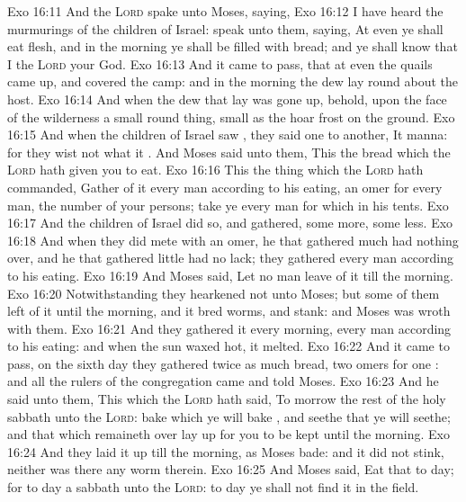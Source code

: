 \vs Exo 16:11 And the \textsc{Lord} spake unto Moses, saying,
\vs Exo 16:12 I have heard the murmurings of the children of Israel: speak unto them, saying, At even ye shall eat flesh, and in the morning ye shall be filled with bread; and ye shall know that I  the \textsc{Lord} your God.
\vs Exo 16:13 And it came to pass, that at even the quails came up, and covered the camp: and in the morning the dew lay round about the host.
\vs Exo 16:14 And when the dew that lay was gone up, behold, upon the face of the wilderness  a small round thing,  small as the hoar frost on the ground.
\vs Exo 16:15 And when the children of Israel saw , they said one to another, It  manna: for they wist not what it . And Moses said unto them, This  the bread which the \textsc{Lord} hath given you to eat.
\vs Exo 16:16 This  the thing which the \textsc{Lord} hath commanded, Gather of it every man according to his eating, an omer for every man,  the number of your persons; take ye every man for  which  in his tents.
\vs Exo 16:17 And the children of Israel did so, and gathered, some more, some less.
\vs Exo 16:18 And when they did mete  with an omer, he that gathered much had nothing over, and he that gathered little had no lack; they gathered every man according to his eating.
\vs Exo 16:19 And Moses said, Let no man leave of it till the morning.
\vs Exo 16:20 Notwithstanding they hearkened not unto Moses; but some of them left of it until the morning, and it bred worms, and stank: and Moses was wroth with them.
\vs Exo 16:21 And they gathered it every morning, every man according to his eating: and when the sun waxed hot, it melted.
\vs Exo 16:22 And it came to pass,  on the sixth day they gathered twice as much bread, two omers for one : and all the rulers of the congregation came and told Moses.
\vs Exo 16:23 And he said unto them, This  which the \textsc{Lord} hath said, To morrow  the rest of the holy sabbath unto the \textsc{Lord}: bake  which ye will bake , and seethe that ye will seethe; and that which remaineth over lay up for you to be kept until the morning.
\vs Exo 16:24 And they laid it up till the morning, as Moses bade: and it did not stink, neither was there any worm therein.
\vs Exo 16:25 And Moses said, Eat that to day; for to day  a sabbath unto the \textsc{Lord}: to day ye shall not find it in the field.
